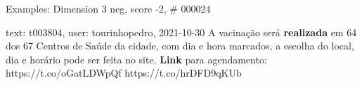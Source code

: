\begin{frame}{Examples: Dimension 3 neg, score -2, \# 000024}
\footnotesize
\begin{alertblock}{text: t003804, user: tourinhopedro, 2021-10-30}
A vacinação será \textbf{realizada} em 64 dos 67 Centros de Saúde da cidade, 
com dia e hora marcados, a escolha do local, dia e horário pode ser feita no 
site. \textbf{Link} para agendamento: https://t.co/oGatLDWpQf 
https://t.co/hrDFD9qKUb 
\end{alertblock}
\end{frame}
